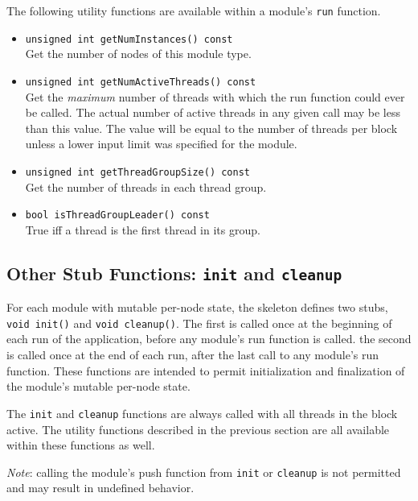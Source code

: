 \documentclass[11pt]{article}
\begin{document}
The following utility functions are available within a module's
\texttt{run} function.

\begin{itemize}

\item \texttt{unsigned int getNumInstances() const} \\
      Get the number of nodes of this module type.

\item \texttt{unsigned int getNumActiveThreads() const} \\
      Get the \emph{maximum} number of threads with which the run
      function could ever be called.  The actual number of active
      threads in any given call may be less than this value.  The
      value will be equal to the number of threads per block unless
      a lower input limit was specified for the module.

\item \texttt{unsigned int getThreadGroupSize() const} \\
      Get the number of threads in each thread group.

\item \texttt{bool isThreadGroupLeader() const} \\
      True iff a thread is the first thread in its group.

\end{itemize}


\subsection{Other Stub Functions: \texttt{init} and \texttt{cleanup}}

For each module with mutable per-node state, the skeleton defines two
stubs, \texttt{void init()} and \texttt{void cleanup()}.  The first is
called once at the beginning of each run of the application, before
any module's run function is called.  the second is called once at the
end of each run, after the last call to any module's run
function. These functions are intended to permit initialization and
finalization of the module's mutable per-node state.

The \texttt{init} and \texttt{cleanup} functions are always called
with all threads in the block active.  The utility functions
described in the previous section are all available within these
functions as well.

\emph{Note}: calling the module's push function from \texttt{init} or
\texttt{cleanup} is not permitted and may result in undefined
behavior.
\end{document}
